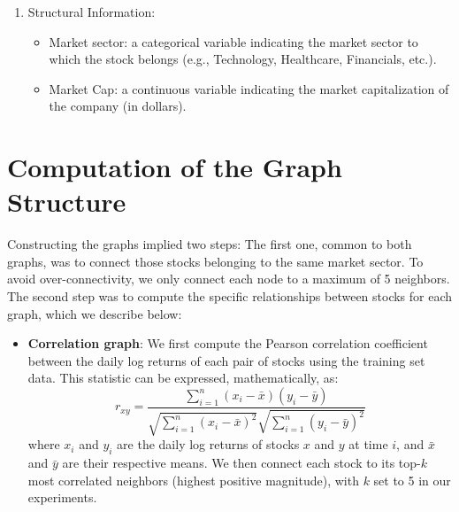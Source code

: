\documentclass{article}
\begin{document}
\begin{appendix}
\begin{enumerate}
\begin{itemize}
                  \item Monthly Moving Average (20MA): the average of the adjusted closing price over the past 20 trading days.
                  \item Relative Strength Index (RSI): a momentum oscillator that measures the speed and change of price movements, calculated as $RSI = 100 - \frac{100}{1 + RS}$, where $RS$ is the average gain of up periods divided by the average loss of down periods over a specified time frame (14 trading days in our case).
                  \item Rolling Volatility: the standard deviation of the daily log returns over a rolling window of 20 trading days.
              \end{itemize}
        \item Structural Information:
              \begin{itemize}
                  \item Market sector: a categorical variable indicating the market sector to which the stock belongs (e.g., Technology, Healthcare, Financials, etc.).
                  \item Market Cap: a continuous variable indicating the market capitalization of the company (in dollars).
              \end{itemize}
    \end{enumerate}

    \section{Computation of the Graph Structure}
    \label{appendix:graph_computation}

    Constructing the graphs implied two steps: The first one, common to both graphs, was to connect those stocks belonging to the same market sector. To avoid over-connectivity, we only connect each node to a maximum of 5 neighbors. The second step was to compute the specific relationships between stocks for each graph, which we describe below:
    \begin{itemize}
        \item \textbf{Correlation graph}: We first compute the Pearson correlation coefficient between the daily log returns of each pair of stocks using the training set data. This statistic can be expressed, mathematically, as:
              \begin{equation}
                  r_{xy} = \frac{\sum_{i=1}^{n} (x_i - \bar{x})(y_i - \bar{y})}{\sqrt{\sum_{i=1}^{n} (x_i - \bar{x})^2} \sqrt{\sum_{i=1}^{n} (y_i - \bar{y})^2}}
              \end{equation}
              where $x_i$ and $y_i$ are the daily log returns of stocks $x$ and $y$ at time $i$, and $\bar{x}$ and $\bar{y}$ are their respective means. We then connect each stock to its top-$k$ most correlated neighbors (highest positive magnitude), with $k$ set to 5 in our experiments.


\end{itemize}
\end{appendix}
\end{document}
